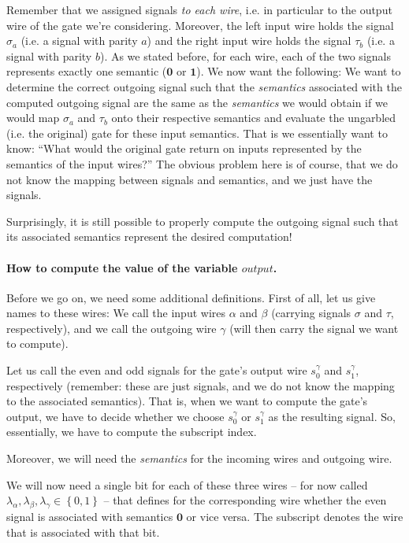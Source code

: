 \message{ !name(seminar.tex)}\documentclass{llncs}
\begin{document}
Remember that we assigned signals \emph{to each wire}, i.e. in particular to the output wire of the gate we're considering. Moreover, the left input wire holds the signal $\sigma_a$ (i.e. a signal with parity $a$) and the right input wire holds the signal $\tau_b$ (i.e. a signal with parity $b$). As we stated before, for each wire, each of the two signals represents exactly one semantic ($\mathbf{0}$ or $\mathbf{1}$). We now want the following: We want to determine the correct outgoing signal such that the \emph{semantics} associated with the computed outgoing signal are the same as the \emph{semantics} we would obtain if we would map $\sigma_a$ and $\tau_b$ onto their respective semantics and evaluate the ungarbled (i.e. the original) gate for these input semantics. That is we essentially want to know: ``What would the original gate return on inputs represented by the semantics of the input wires?'' The obvious problem here is of course, that we do not know the mapping between signals and semantics, and we just have the signals.

Surprisingly, it is still possible to properly compute the outgoing signal such that its associated semantics represent the desired computation! 

\paragraph{How to compute the value of the variable $output$.}
\label{sec:how-compute-value-variable-output}

Before we go on, we need some additional definitions. First of all, let us give names to these wires: We call the input wires $\alpha$ and $\beta$ (carrying signals $\sigma$ and $\tau$, respectively), and we call the outgoing wire $\gamma$ (will then carry the signal we want to compute).

Let us call the even and odd signals for the gate's output wire $s^\gamma_0$ and $s^\gamma_1$, respectively (remember: these are just signals, and we do not know the mapping to the associated semantics). That is, when we want to compute the gate's output, we have to decide whether we choose $s^\gamma_0$ or $s^\gamma_1$ as the resulting signal. So, essentially, we have to compute the subscript index.

\newcommand{\semoutput}{\lambda}

Moreover, we will need the \emph{semantics} for the incoming wires and outgoing wire. 

We will now need a single bit for each of these three wires -- for now called $\semoutput_\alpha,\semoutput_\beta,\semoutput_\gamma\in\left\{ 0,1 \right\}$ -- that defines for the corresponding wire whether the even signal is associated with semantics $\mathbf{0}$ or vice versa. The subscript denotes the wire that is associated with that bit.
\end{document}
